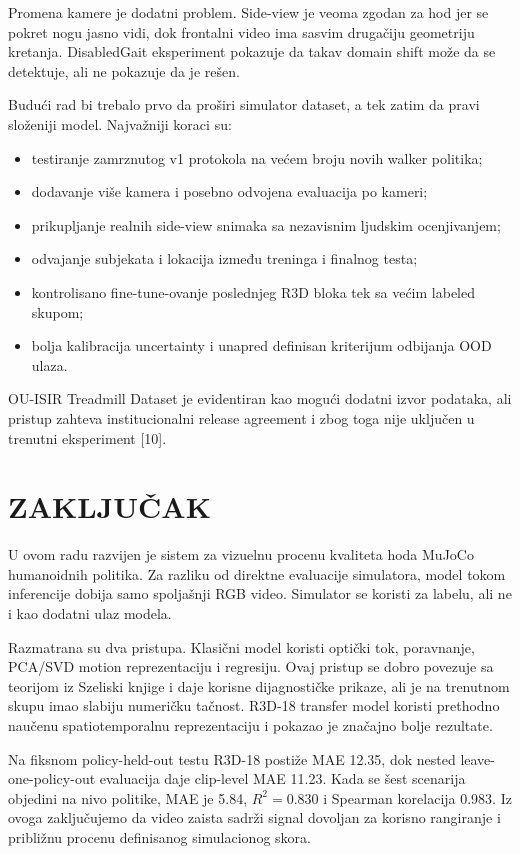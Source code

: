 ﻿\documentclass[12pt,a4paper]{report}
\begin{document}
Promena kamere je dodatni problem. Side-view je veoma zgodan za hod jer se
pokret nogu jasno vidi, dok frontalni video ima sasvim drugačiju geometriju
kretanja. DisabledGait eksperiment pokazuje da takav domain shift može da se
detektuje, ali ne pokazuje da je rešen.

Budući rad bi trebalo prvo da proširi simulator dataset, a tek zatim da pravi
složeniji model. Najvažniji koraci su:
\begin{itemize}
  \item testiranje zamrznutog v1 protokola na većem broju novih walker politika;
  \item dodavanje više kamera i posebno odvojena evaluacija po kameri;
  \item prikupljanje realnih side-view snimaka sa nezavisnim ljudskim ocenjivanjem;
  \item odvajanje subjekata i lokacija između treninga i finalnog testa;
  \item kontrolisano fine-tune-ovanje poslednjeg R3D bloka tek sa većim labeled skupom;
  \item bolja kalibracija uncertainty i unapred definisan kriterijum odbijanja OOD ulaza.
\end{itemize}

OU-ISIR Treadmill Dataset je evidentiran kao mogući dodatni izvor podataka, ali
pristup zahteva institucionalni release agreement i zbog toga nije uključen u
trenutni eksperiment [10].

\chapter{ZAKLJUČAK}

U ovom radu razvijen je sistem za vizuelnu procenu kvaliteta hoda MuJoCo
humanoidnih politika. Za razliku od direktne evaluacije simulatora, model tokom
inferencije dobija samo spoljašnji RGB video. Simulator se koristi za labelu,
ali ne i kao dodatni ulaz modela.

Razmatrana su dva pristupa. Klasični model koristi optički tok, poravnanje,
PCA/SVD motion reprezentaciju i regresiju. Ovaj pristup se dobro povezuje sa
teorijom iz Szeliski knjige i daje korisne dijagnostičke prikaze, ali je na
trenutnom skupu imao slabiju numeričku tačnost. R3D-18 transfer model koristi
prethodno naučenu spatiotemporalnu reprezentaciju i pokazao je značajno bolje
rezultate.

Na fiksnom policy-held-out testu R3D-18 postiže MAE 12.35, dok nested
leave-one-policy-out evaluacija daje clip-level MAE 11.23. Kada se šest
scenarija objedini na nivo politike, MAE je 5.84, $R^2=0.830$ i Spearman
korelacija 0.983. Iz ovoga zaključujemo da video zaista sadrži signal dovoljan
za korisno rangiranje i približnu procenu definisanog simulacionog skora.
\end{document}
